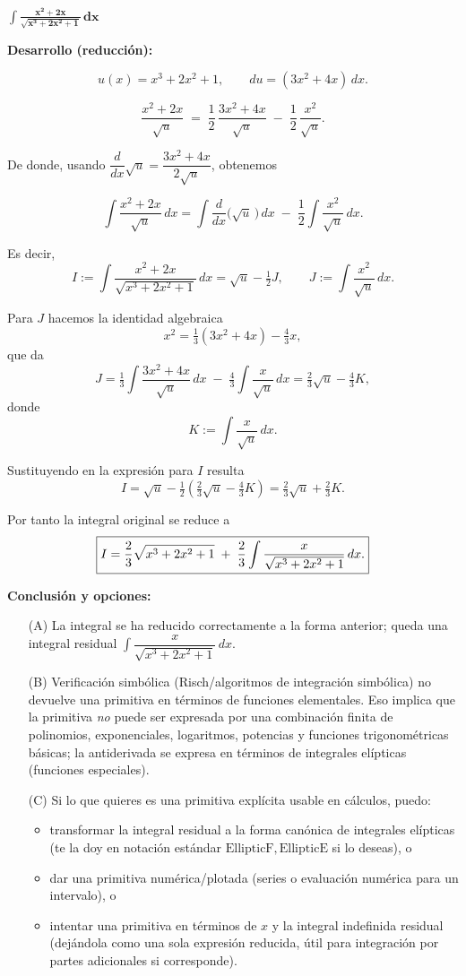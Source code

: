 $\displaystyle \mathbf{\int \frac{x^{2}+2x}{\sqrt{x^{3}+2x^{2}+1}}\,dx}$

\nopagebreak
\textbf{Desarrollo (reducción):}

\[
u(x)=x^{3}+2x^{2}+1,\qquad du=(3x^{2}+4x)\,dx.
\]

\[
\frac{x^{2}+2x}{\sqrt{u}} \;=\; 
\frac{1}{2}\,\frac{3x^{2}+4x}{\sqrt{u}} \;-\; \frac{1}{2}\,\frac{x^{2}}{\sqrt{u}}.
\]

De donde, usando $\dfrac{d}{dx}\sqrt{u}=\dfrac{3x^{2}+4x}{2\sqrt{u}}$, obtenemos

\[
\int \frac{x^{2}+2x}{\sqrt{u}}\,dx
= \int \frac{d}{dx}\big(\sqrt{u}\,\big)\,dx \;-\; \frac{1}{2}\int \frac{x^{2}}{\sqrt{u}}\,dx.
\]

Es decir,
\[
I := \int \frac{x^{2}+2x}{\sqrt{x^{3}+2x^{2}+1}}\,dx
= \sqrt{u} - \tfrac{1}{2}J,
\qquad J:=\int \frac{x^{2}}{\sqrt{u}}\,dx.
\]

Para $J$ hacemos la identidad algebraica
\[
x^{2}=\tfrac{1}{3}(3x^{2}+4x)-\tfrac{4}{3}x,
\]
que da
\[
J=\tfrac{1}{3}\int\frac{3x^{2}+4x}{\sqrt{u}}\,dx \;-\; \tfrac{4}{3}\int\frac{x}{\sqrt{u}}\,dx
= \tfrac{2}{3}\sqrt{u} - \tfrac{4}{3}K,
\]
donde
\[
K:=\int\frac{x}{\sqrt{u}}\,dx.
\]

Sustituyendo en la expresión para \(I\) resulta
\[
I = \sqrt{u} - \tfrac{1}{2}\!\left(\tfrac{2}{3}\sqrt{u} - \tfrac{4}{3}K\right)
= \tfrac{2}{3}\sqrt{u} + \tfrac{2}{3}K.
\]

Por tanto la integral original se reduce a
\[
\boxed{%
I=\frac{2}{3}\sqrt{x^{3}+2x^{2}+1} \;+\; \frac{2}{3}\int \frac{x}{\sqrt{x^{3}+2x^{2}+1}}\,dx.}
\]

\nopagebreak
\textbf{Conclusión y opciones:}

\begin{enumerate}
\item[(A)] La integral se ha reducido correctamente a la forma anterior; queda una integral residual
\(\displaystyle \int \dfrac{x}{\sqrt{x^{3}+2x^{2}+1}}\,dx\).
\item[(B)] Verificación simbólica (Risch/algoritmos de integración simbólica) no devuelve una primitiva en términos de funciones elementales. Eso implica que la primitiva \emph{no} puede ser expresada por una combinación finita de polinomios, exponenciales, logaritmos, potencias y funciones trigonométricas básicas; la antiderivada se expresa en términos de integrales elípticas (funciones especiales).
\item[(C)] Si lo que quieres es una primitiva explícita usable en cálculos, puedo:
  \begin{itemize}
  \item transformar la integral residual a la forma canónica de integrales elípticas (te la doy en notación estándar \(\mathrm{EllipticF},\mathrm{EllipticE}\) si lo deseas), o
  \item dar una primitiva numérica/plotada (series o evaluación numérica para un intervalo), o
  \item intentar una primitiva en términos de \(x\) y la integral indefinida residual (dejándola como una sola expresión reducida, útil para integración por partes adicionales si corresponde).
  \end{itemize}
\end{enumerate}

